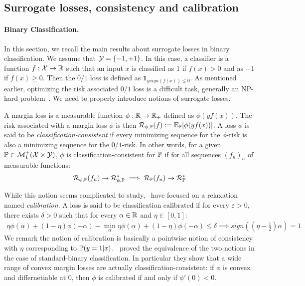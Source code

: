 \subsection{Surrogate losses, consistency and calibration} 

\paragraph{Binary Classification.} In this section, we recall the main results about surrogate losses in binary classification. We assume that $\mathcal{Y} = \{-1,+1\}$. In this case, a classifier is a function $f:\mathcal{X}\to\mathbb{R}$ such that an input $x$ is classified as $1$ if $f(x)>0$ and as $-1$ if $f(x)\geq 0$. Then the $0/1$ loss is defined as $\mathbf{1}_{ysign(f(x))\leq0}$. As mentioned earlier, optimizing the risk associated $0/1$ loss is a difficult task, generally an NP-hard problem~\cite{xxx}. We need to properly introduce notions of surrogate losses. 

A margin loss is a measurable function $\phi:\mathbb{R}\to\mathbb{R}_+$ defined as $\phi(yf(x))$. The risk associated with a margin loss $\phi$ is then $\risk_{\phi,\PP}(f):=\mathbb{E}_\PP\left[\phi(yf(x))\right]$. A loss $\phi$ is said to be \emph{classification-consistent} if every minimizing sequence for the $\phi$-risk is also a minimizing sequence for the $0/1$-risk. In other words, for a given $\mathbb{P}\in\mathcal{M}_1^+(\mathcal{X}\times\mathcal{Y})$, $\phi$ is classification-consistent for $\mathbb{P}$ if for all sequences $(f_n)_n$ of measurable functions:
\begin{align}
    \mathcal{R}_{\phi,\mathbb{P}}(f_n)\to \mathcal{R}_{\phi,\mathbb{P}}^\star\implies\mathcal{R}_{\mathbb{P}}(f_n)\to \mathcal{R}_{\mathbb{P}}^\star
\end{align}

 While this notion seems complicated to study,~\cite{bartlett2006convexity,steinwart2007compare} have focused on a relaxation named \emph{calibration}. A loss is said to be classification calibrated if for every $\varepsilon>0$, there exists $\delta>0$ such that for every $\alpha\in\mathbb{R}$ and $\eta\in[0,1]$:
\begin{align*}
    \eta\phi(\alpha)+(1-\eta)\phi(-\alpha)-\min_{\alpha} \eta\phi(\alpha)+(1-\eta)\phi(-\alpha)\leq \delta\implies sign\left((\eta-\frac12)\alpha\right)=1
\end{align*}
We remark the notion of calibration is basically a pointwise notion of consistency with $\eta$ corresponding to $\mathbb{P}(y=1|x)$.~\cite{bartlett2006convexity,steinwart2007compare} proved the equivalence of the two notions in the case of standard-binary classification. In particular they show that a wide range of convex margin losses are actually classification-consistent: if $\phi$ is convex and differnetiable at $0$, then $\phi$ is calibrated if and only if $\phi'(0)<0$.





